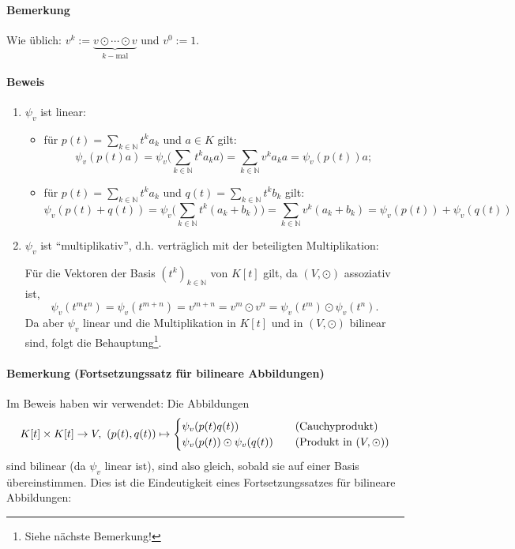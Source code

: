\paragraph{Bemerkung}
	Wie üblich: $ v^k := \underset{k-\text{mal}}{\underbrace{v\odot\cdots \odot v}} $ und $ v^0 := 1 $.
\paragraph{Beweis}
	\begin{enumerate}
		\item $ \psi_v $ ist linear:
			\begin{itemize}
				\item für $ p(t) = \sum_{k\in\mathbb{N}} t^ka_k $ und $ a\in K $ gilt:
					\[ \psi_v(p(t)a) = \psi_v\Big(\sum_{k\in\mathbb{N}} t^ka_ka\Big) = \sum_{k\in\mathbb{N}} v^ka_ka = \psi_v(p(t))a; \]
				\item für $ p(t) = \sum_{k\in\mathbb{N}} t^ka_k $ und $ q(t) = \sum_{k\in\mathbb{N}} t^k b_k $ gilt:
					\[ \psi_v(p(t)+q(t)) = \psi_v\Big(\sum_{k\in\mathbb{N}}t^k(a_k+b_k)\Big) = \sum_{k\in\mathbb{N}} v^k(a_k+b_k) = \psi_v(p(t))+\psi_v(q(t)) \]
			\end{itemize}
		\item $ \psi_v $ ist "`multiplikativ"', d.h. verträglich mit der beteiligten Multiplikation:
		
			Für die Vektoren der Basis $ (t^k)_{k\in\mathbb{N}} $ von $ K[t] $ gilt, da $ (V,\odot) $ assoziativ ist,
				\[ \psi_v(t^mt^n) = \psi_v(t^{m+n}) = v^{m+n} = v^m\odot v^n = \psi_v(t^m)\odot \psi_v(t^n). \]
			Da aber $ \psi_v $ linear und die Multiplikation in $ K[t] $ und in $ (V,\odot) $ bilinear sind, folgt die Behauptung\footnote{Siehe nächste Bemerkung!}.
	\end{enumerate}
\paragraph{Bemerkung (Fortsetzungssatz für bilineare Abbildungen)}
	Im Beweis haben wir verwendet: Die Abbildungen
		\[ K[t]\times K[t]\to V,\ (p(t),q(t))\mapsto
			\begin{cases}
				\psi_v(p(t)q(t))               & \quad\text{(Cauchyprodukt)}       \\
				\psi_v(p(t))\odot \psi_v(q(t)) & \quad\text{(Produkt in $ (V,\odot) $)}
			\end{cases}
		\]
	sind bilinear (da $ \psi_v $ linear ist), sind also gleich, sobald sie auf einer Basis übereinstimmen.
	Dies ist die Eindeutigkeit eines Fortsetzungssatzes für bilineare Abbildungen:
	
